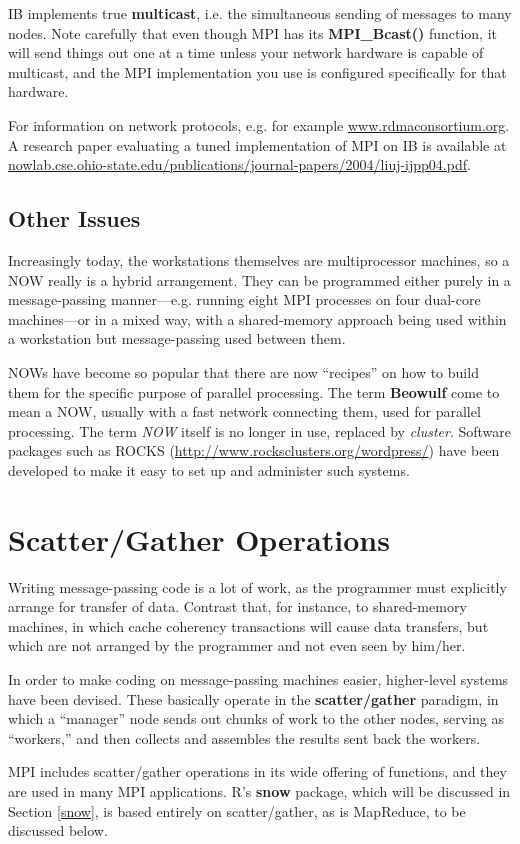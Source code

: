 IB implements true {\bf multicast}, i.e. the simultaneous sending of
messages to many nodes.  Note carefully that even though MPI has its
{\bf MPI\_Bcast()} function, it will send things out one at a time
unless your network hardware is capable of multicast, and the MPI
implementation you use is configured specifically for that hardware.

For information on network protocols, e.g. for example
\url{www.rdmaconsortium.org}.  A research paper evaluating a tuned
implementation of MPI on IB is available at
\url{nowlab.cse.ohio-state.edu/publications/journal-papers/2004/liuj-ijpp04.pdf}.

\subsection{Other Issues}

Increasingly today, the workstations themselves are multiprocessor
machines, so a NOW really is a hybrid arrangement.  They can be
programmed either purely in a message-passing manner---e.g. running
eight MPI processes on four dual-core machines---or in a mixed way, with
a shared-memory approach being used within a workstation but
message-passing used between them.

NOWs have become so popular that there are now ``recipes'' on how to
build them for the specific purpose of parallel processing.  The term
{\bf Beowulf} come to mean a NOW, usually with a fast network connecting
them, used for parallel processing.  The term {\it NOW} itself is no
longer in use, replaced by {\it cluster}.  Software packages such as
ROCKS (\url{http://www.rocksclusters.org/wordpress/}) have been
developed to make it easy to set up and administer such systems.

\section{Scatter/Gather Operations}
\label{scattergather}

Writing message-passing code is a lot of work, as the programmer must
explicitly arrange for transfer of data.  Contrast that, for instance,
to shared-memory machines, in which cache coherency transactions will
cause data transfers, but which are not arranged by the programmer and
not even seen by him/her.

In order to make coding on message-passing machines easier, higher-level
systems have been devised.  These basically operate in the {\bf
scatter/gather} paradigm, in which a ``manager'' node sends out chunks
of work to the other nodes, serving as ``workers,'' and then collects
and assembles the results sent back the workers.

MPI includes scatter/gather operations in its wide offering of
functions, and they are used in many MPI applications.  R's {\bf snow}
package, which will be discussed in Section \ref{snow}, is based
entirely on scatter/gather, as is MapReduce, to be discussed below.

